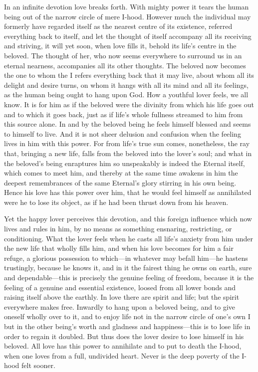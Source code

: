 \documentclass[12pt,a4paper]{book}
\begin{document}
In an infinite devotion love breaks forth. With mighty power it tears the
human being out of the narrow circle of mere I-hood. However much the
individual may formerly have regarded itself as the nearest centre of its
existence, referred everything back to itself, and let the thought of
itself accompany all its receiving and striving, it will yet soon, when
love fills it, behold its life's centre in the beloved. The thought of her,
who now seems everywhere to surround us in an eternal nearness, accompanies
all its other thoughts. The beloved now becomes the one to whom the I
refers everything back that it may live, about whom all its delight and
desire turns, on whom it hangs with all its mind and all its feelings, as
the human being ought to hang upon God. How a youthful lover feels, we all
know. It is for him as if the beloved were the divinity from which his life
goes out and to which it goes back, just as if life's whole fullness
streamed to him from this source alone. In and by the beloved being he
feels himself blessed and seems to himself to live. And it is not sheer
delusion and confusion when the feeling lives in him with this power. For
from life's true sun comes, nonetheless, the ray that, bringing a new life,
falls from the beloved into the lover's soul; and what in the beloved's
being enraptures him so unspeakably is indeed the Eternal itself, which
comes to meet him, and thereby at the same time awakens in him the deepest
remembrances of the same Eternal's glory stirring in his own being. Hence
his love has this power over him, that he would feel himself as annihilated
were he to lose its object, as if he had been thrust down from his heaven.

Yet the happy lover perceives this devotion, and this foreign influence
which now lives and rules in him, by no means as something ensnaring,
restricting, or conditioning. What the lover feels when he casts all life's
anxiety from him under the new life that wholly fills him, and when his love
becomes for him a fair refuge, a glorious possession to which---in whatever
may befall him---he hastens trustingly, because he knows it, and in it the
fairest thing he owns on earth, sure and dependable---this is precisely the
genuine feeling of freedom, because it is the feeling of a genuine and
essential existence, loosed from all lower bonds and raising itself above
the earthly. In love there are spirit and life; but the spirit everywhere
makes free. Inwardly to hang upon a beloved being, and to give oneself
wholly over to it, and to enjoy life not in the narrow circle of one's own
I but in the other being's worth and gladness and happiness---this is to
lose life in order to regain it doubled. But thus does the lover desire to
lose himself in his beloved. All love has this power to annihilate and to
put to death the I-hood, when one loves from a full, undivided heart. Never
is the deep poverty of the I-hood felt sooner.
\end{document}
